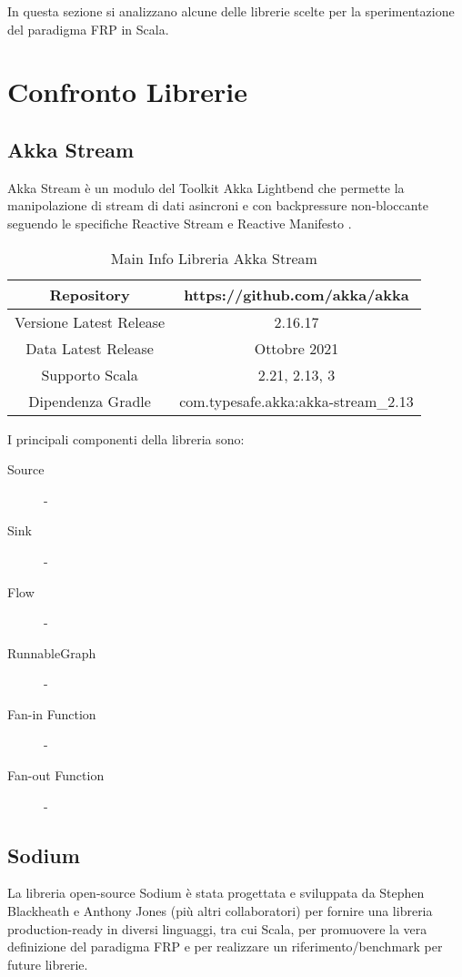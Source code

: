 \documentclass[../main.tex]{subfiles}
\begin{document}
In questa sezione si analizzano alcune delle librerie scelte per la sperimentazione del paradigma FRP in Scala.

\section{Confronto Librerie}

\subsection{Akka Stream}
Akka Stream è un modulo del Toolkit Akka Lightbend che permette la manipolazione di stream di dati asincroni e con backpressure non-bloccante seguendo le specifiche Reactive Stream \cite{frp4} e Reactive Manifesto \cite{frp3}.

\begin{table}[H]
\centering
\begin{tabular}{|c|c|}
     \hline
     Repository & https://github.com/akka/akka \\
     \hline
     Versione Latest Release & 2.16.17 \\
     \hline
     Data Latest Release & Ottobre 2021 \\
     \hline
     Supporto Scala & 2.21, 2.13, 3 \\
     \hline
     Dipendenza Gradle & com.typesafe.akka:akka-stream\_2.13 \\
     \hline
\end{tabular}
\caption{Main Info Libreria Akka Stream}
\end{table}


I principali componenti della libreria sono:
\begin{description}
  \item[Source] -
  \item[Sink] - 
  \item[Flow] - 
  \item[RunnableGraph] - 
  \item[Fan-in Function] -
  \item[Fan-out Function] -
\end{description}


\subsection{Sodium}
La libreria open-source Sodium è stata progettata e sviluppata da Stephen Blackheath e Anthony Jones (più altri collaboratori) per fornire una libreria production-ready in diversi linguaggi, tra cui Scala, per promuovere la vera definizione del paradigma FRP e per realizzare un riferimento/benchmark per future librerie.
\end{document}
